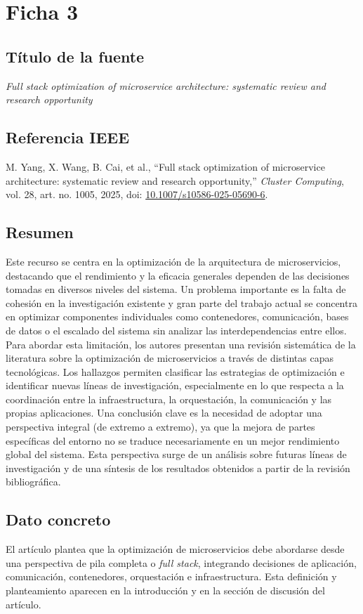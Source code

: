 \documentclass[11pt]{article}
\begin{document}
\section*{Ficha 3}

\subsection*{Título de la fuente}
\textit{Full stack optimization of microservice architecture: systematic review and research opportunity}

\subsection*{Referencia IEEE}
M. Yang, X. Wang, B. Cai, et al., ``Full stack optimization of microservice architecture: systematic review and research opportunity,'' \textit{Cluster Computing}, vol. 28, art. no. 1005, 2025, doi: \href{https://doi.org/10.1007/s10586-025-05690-6}{10.1007/s10586-025-05690-6}.

\subsection*{Resumen}
Este recurso se centra en la optimización de la arquitectura de microservicios, destacando que el rendimiento y la eficacia generales dependen de las decisiones tomadas en diversos niveles del sistema. Un problema importante es la falta de cohesión en la investigación existente y gran parte del trabajo actual se concentra en optimizar componentes individuales como contenedores, comunicación, bases de datos o el escalado del sistema sin analizar las interdependencias entre ellos. Para abordar esta limitación, los autores presentan una revisión sistemática de la literatura sobre la optimización de microservicios a través de distintas capas tecnológicas. Los hallazgos permiten clasificar las estrategias de optimización e identificar nuevas líneas de investigación, especialmente en lo que respecta a la coordinación entre la infraestructura, la orquestación, la comunicación y las propias aplicaciones. Una conclusión clave es la necesidad de adoptar una perspectiva integral (de extremo a extremo), ya que la mejora de partes específicas del entorno no se traduce necesariamente en un mejor rendimiento global del sistema. Esta perspectiva surge de un análisis sobre futuras líneas de investigación y de una síntesis de los resultados obtenidos a partir de la revisión bibliográfica.

\subsection*{Dato concreto}
El artículo plantea que la optimización de microservicios debe abordarse desde una perspectiva de pila completa o \textit{full stack}, integrando decisiones de aplicación, comunicación, contenedores, orquestación e infraestructura. Esta definición y planteamiento aparecen en la introducción y en la sección de discusión del artículo.
\end{document}
